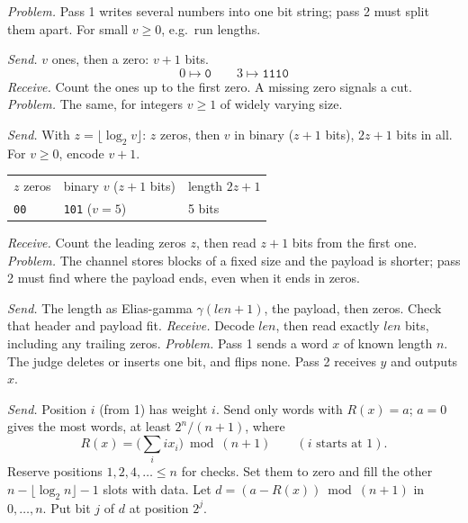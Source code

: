 {\footnotesize\tightdisplay
{}
\textit{Problem.} Pass 1 writes several numbers into one bit string; pass 2 must split them apart. For small $v\ge0$, e.g.\ run lengths.
\par\textit{Send.} $v$ ones, then a zero: $v+1$ bits.
\[ 0\mapsto\texttt{0}\qquad 3\mapsto\texttt{1110} \]
\textit{Receive.} Count the ones up to the first zero. A missing zero signals a cut.
\textit{Problem.} The same, for integers $v\ge1$ of widely varying size.
\par\textit{Send.} With $z=\lfloor\log_2 v\rfloor$: $z$ zeros, then $v$ in binary ($z+1$ bits), $2z+1$ bits in all. For $v\ge0$, encode $v+1$.
\par\begin{tabular}{@{}lll@{}}
$z$ zeros & binary $v$ ($z+1$ bits) & length $2z+1$ \\
\texttt{00} & \texttt{101} ($v=5$) & 5 bits \\
\end{tabular}\par
\textit{Receive.} Count the leading zeros $z$, then read $z+1$ bits from the first one.
\textit{Problem.} The channel stores blocks of a fixed size and the payload is shorter; pass 2 must find where the payload ends, even when it ends in zeros.
\par\textit{Send.} The length as Elias-gamma $\gamma(\mathit{len}+1)$, the payload, then zeros. Check that header and payload fit.
\textit{Receive.} Decode $\mathit{len}$, then read exactly $\mathit{len}$ bits, including any trailing zeros.
\textit{Problem.} Pass 1 sends a word $x$ of known length $n$. The judge deletes or inserts one bit, and flips none. Pass 2 receives $y$ and outputs $x$.
\par\textit{Send.} Position $i$ (from 1) has weight $i$. Send only words with $R(x)=a$; $a=0$ gives the most words, at least $2^n/(n+1)$, where
\[ R(x)=\Big(\sum_i i x_i\Big)\bmod(n+1) \qquad (i\text{ starts at }1). \]
Reserve positions $1,2,4,\ldots\le n$ for checks. Set them to zero and fill the other $n-\lfloor\log_2 n\rfloor-1$ slots with data. Let $d=(a-R(x))\bmod(n+1)$ in $0,\ldots,n$. Put bit $j$ of $d$ at position $2^j$.
}
